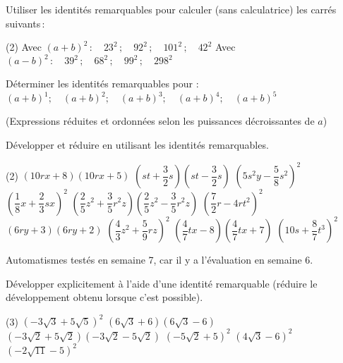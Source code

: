 \documentclass[a4paper,12pt]{report}
\begin{document}
\begin{exo}
	Utiliser les identités remarquables pour calculer (sans calculatrice) les carrés suivants\,:
	\begin{tasks}(2)
\task Avec $(a+b)^2\,: \quad  23^2\,;\quad  92^2\,;\quad 101^2\,;\quad 42^2$
\task Avec $(a-b)^2\,:\quad 39^2\,;\quad 68^2\,;\quad 99^2\,;\quad 298^2$
	\end{tasks}
\end{exo}
\begin{exo}
Déterminer les identités remarquables pour : $(a+b)^1 ; \quad(a+b)^2 ; \quad(a+b)^3 ; \quad(a+b)^4 ; \quad(a+b)^5$ 

(Expressions réduites et ordonnées selon les puissances décroissantes de $a$)
\end{exo}

\begin{exo}
	Développer et réduire en utilisant les identités remarquables.
\begin{tasks}(2)
	\task $\left(10 r x+8 \right)\left(10 r x+5 \right)$
	\task $\left(s t+ \dfrac{3}{2} s\right)\left(s t-\dfrac{3}{2} s\right)$
	\task $\left(5 s^2 y-\dfrac{5}{8} s^2\right)^2$
	\task $\left(\dfrac{1}{8} x+\dfrac{2}{3} s x\right)^2$
	\task $\left(\dfrac{2}{5} z^2+ \dfrac{3}{5} r^2 z\right)\left(\dfrac{2}{5} z^2-\dfrac{3}{5} r^2 z\right)$
	\task $\left(\dfrac{7}{2} r-4 r t^2\right)^2$
	\task $\left(6 r y+3 \right)\left(6 r y+2 \right)$
	\task $\left(\dfrac{4}{3} z^2+\dfrac{5}{9} r z\right)^2$
	\task $\left(\dfrac{4}{7} t x-8 \right)\left(\dfrac{4}{7} t x+7 \right)$
	\task $\left(10 s+\dfrac{8}{7} t^3\right)^2$
\end{tasks}
\end{exo}
Automatismes testés en semaine 7, car il y a l'évaluation en semaine 6.

\begin{auto}Développer explicitement à l'aide d'une identité remarquable
(réduire le développement obtenu lorsque c'est possible).

\begin{tasks}(3)
	\task  $\left(-3 \sqrt{3} +5\sqrt{5}\right)^{2}$ 
	\task  $\left(6 \sqrt{3} +6\right)\left(6 \sqrt{3}-6\right)$ 
	\task  $\left(-3 \sqrt{2} +5\sqrt{2}\right)\left(-3 \sqrt{2}-5\sqrt{2}\right)$ 
	\task  $\left(-5 \sqrt{2} +5\right)^{2}$ 
	\task  $\left(4 \sqrt{3} -6\right)^{2}$ 
	\task  $\left(-2 \sqrt{11} -5\right)^{2}$ 
\end{tasks}

\end{auto}
\end{document}
